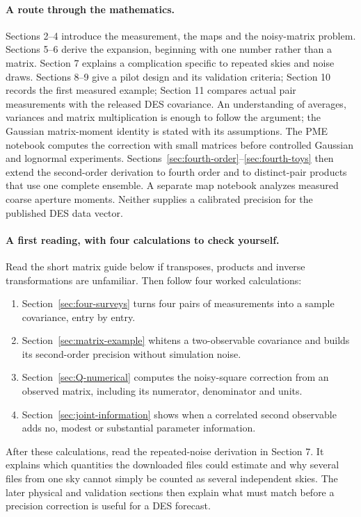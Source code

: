\documentclass[11pt]{article}
\begin{document}
\paragraph{A route through the mathematics.}
Sections 2--4 introduce the measurement, the maps and the noisy-matrix
problem. Sections 5--6 derive the expansion, beginning with one number rather
than a matrix. Section 7 explains a complication specific to repeated skies
and noise draws. Sections 8--9 give a pilot design and its validation criteria;
Section 10 records the first measured example; Section 11 compares actual
pair measurements with the released DES covariance.
An understanding of averages, variances and matrix multiplication is enough
to follow the argument; the Gaussian matrix-moment identity is stated with
its assumptions. The PME notebook computes the correction with small
matrices before controlled Gaussian and lognormal experiments.
Sections~\ref{sec:fourth-order}--\ref{sec:fourth-toys} then extend the
second-order derivation to fourth order and to distinct-pair products that
use one complete ensemble. A separate map notebook
analyzes measured coarse aperture moments. Neither supplies a calibrated
precision for the published DES data vector.

\paragraph{A first reading, with four calculations to check yourself.}
Read the short matrix guide below if transposes, products and inverse
transformations are unfamiliar. Then follow four worked calculations:
\begin{enumerate}
 \item Section~\ref{sec:four-surveys} turns four pairs of measurements
 into a sample covariance, entry by entry.
 \item Section~\ref{sec:matrix-example} whitens a two-observable covariance
 and builds its second-order precision without simulation noise.
 \item Section~\ref{sec:Q-numerical} computes the noisy-square correction
 from an observed matrix, including its numerator, denominator and units.
 \item Section~\ref{sec:joint-information} shows when a correlated second
 observable adds no, modest or substantial parameter information.
\end{enumerate}
After these calculations, read the repeated-noise derivation in Section 7.
It explains which quantities the downloaded files could estimate and why several
files from one sky cannot simply be counted as several independent skies.
The later physical and validation sections then explain what must match
before a precision correction is useful for a DES forecast.
\end{document}
